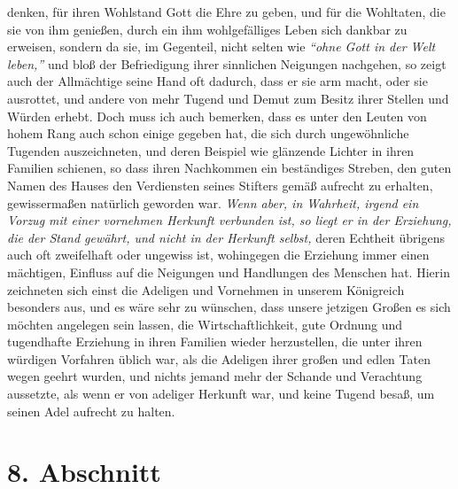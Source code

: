 denken, für ihren Wohlstand Gott die Ehre zu geben, und für die Wohltaten, die
sie von ihm genießen, durch ein ihm wohlgefälliges Leben sich dankbar zu
erweisen, sondern da sie, im Gegenteil, nicht selten wie
\textit{"`ohne Gott in der
Welt leben,"'} und bloß der Befriedigung ihrer sinnlichen Neigungen nachgehen,
so zeigt auch der Allmächtige seine Hand oft dadurch, dass
er sie arm macht, oder
sie ausrottet, und andere von mehr Tugend und Demut zum
Besitz ihrer Stellen
und Würden erhebt. Doch muss ich auch bemerken, dass es unter den Leuten von
hohem
Rang auch schon einige gegeben hat, die sich durch ungewöhnliche Tugenden
auszeichneten, und deren Beispiel wie glänzende Lichter in ihren Familien
schienen, so dass ihren Nachkommen ein beständiges Streben, den guten Namen des
Hauses den Verdiensten seines Stifters gemäß aufrecht zu erhalten, gewissermaßen
natürlich geworden war. \textit{Wenn aber, in Wahrheit, irgend ein Vorzug mit
einer
vornehmen Herkunft
verbunden ist, so liegt er in der Erziehung,
die der Stand
gewährt, und nicht in der Herkunft selbst,} deren Echtheit übrigens auch oft
zweifelhaft oder ungewiss ist, wohingegen die Erziehung immer einen mächtigen,
Einfluss auf die Neigungen und Handlungen des Menschen hat. Hierin zeichneten
sich einst die Adeligen und Vornehmen in unserem Königreich besonders aus,
und es wäre sehr zu wünschen, dass unsere jetzigen Großen es sich möchten
angelegen sein lassen, die Wirtschaftlichkeit, gute Ordnung und tugendhafte
Erziehung in ihren Familien wieder herzustellen, die unter ihren würdigen
Vorfahren üblich war, als die Adeligen ihrer großen und edlen Taten wegen
geehrt wurden, und nichts jemand mehr der Schande und Verachtung aussetzte, als
wenn er von adeliger Herkunft war, und keine Tugend besaß, um seinen Adel
aufrecht zu halten.

\section{8. Abschnitt} \label{kap11_ab8}

